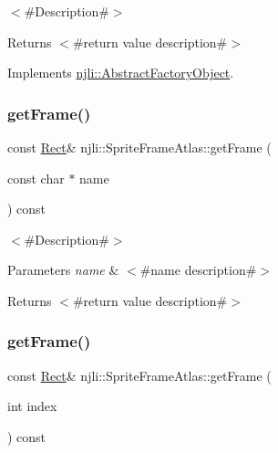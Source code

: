 $<$\#\+Description\#$>$

\begin{DoxyReturn}{Returns}
$<$\#return value description\#$>$ 
\end{DoxyReturn}


Implements \mbox{\hyperlink{classnjli_1_1_abstract_factory_object_af4151e41b80d5bc3fc42822c67fc2278}{njli\+::\+Abstract\+Factory\+Object}}.

\mbox{\label{classnjli_1_1_sprite_frame_atlas_a05db5e5a525a1c9824dc2c59fbd1f57e}} 
\subsubsection{\texorpdfstring{get\+Frame()}{getFrame()}\hspace{0.1cm}{\footnotesize\ttfamily [1/2]}}
{\footnotesize\ttfamily const \mbox{\hyperlink{classnjli_1_1_rect}{Rect}}\& njli\+::\+Sprite\+Frame\+Atlas\+::get\+Frame (\begin{DoxyParamCaption}\item[{const char $\ast$}]{name }\end{DoxyParamCaption}) const}

$<$\#\+Description\#$>$


\begin{DoxyParams}{Parameters}
{\em name} & $<$\#name description\#$>$\\
\hline
\end{DoxyParams}
\begin{DoxyReturn}{Returns}
$<$\#return value description\#$>$ 
\end{DoxyReturn}
\mbox{\label{classnjli_1_1_sprite_frame_atlas_af1b18ca67a6237830f17df7ba9aa9b33}} 
\subsubsection{\texorpdfstring{get\+Frame()}{getFrame()}\hspace{0.1cm}{\footnotesize\ttfamily [2/2]}}
{\footnotesize\ttfamily const \mbox{\hyperlink{classnjli_1_1_rect}{Rect}}\& njli\+::\+Sprite\+Frame\+Atlas\+::get\+Frame (\begin{DoxyParamCaption}\item[{int}]{index }\end{DoxyParamCaption}) const}

